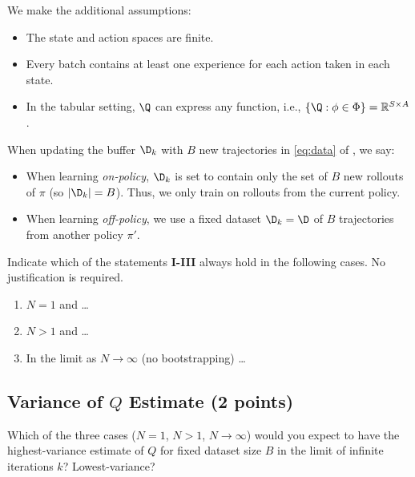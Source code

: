 We make the additional assumptions: 
\begin{itemize}
	\item The state and action spaces are finite.
	\item Every batch contains at least one experience for each action taken in each state.
	\item In the tabular setting, $\Q$ can express any function, i.e., $\{\Q:\phi\in\Phi\}=\mathbb{R}^{S\times A}$.
\end{itemize}
When updating the buffer $\D_k$ with $B$ new trajectories in \cref{eq:data} of , we say:
\begin{itemize}
    \item When learning \textit{on-policy}, $\D_k$ is set to contain only the set of $B$ new rollouts of $\pi$ (so $\lvert \D_k \rvert = B$). Thus, we only train on rollouts from the current policy.
	\item When learning \textit{off-policy}, we use a fixed dataset $\D_k=\D$ of $B$ trajectories from another policy $\pi'$. 
\end{itemize}

Indicate which of the statements \textbf{I-III} always hold in the following cases. No justification is required.
\ifsolutions\solve\thesubsection\else
\begin{enumerate}
\item $N=1$ and \ldots \makecols\ncol\heading\choices
	{} %
	{} %
\item $N>1$ and \ldots \choices
	{} %
	{} %
\item In the limit as $N\to\infty$ (no bootstrapping) \ldots \choices
	{} %
	{} %
\end{enumerate}
\fi

\subsection{Variance of $Q$ Estimate (2 points)}
\label{q:variance_estimate}
Which of the three cases ($N = 1$, $N > 1$, $N \to \infty$) would you expect to have the highest-variance estimate of $Q$ for fixed dataset size $B$ in the limit of infinite iterations $k$? Lowest-variance?

